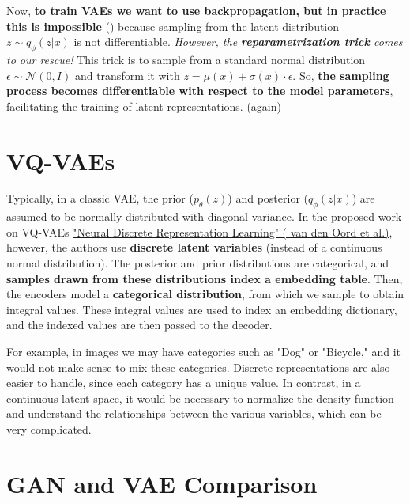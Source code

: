 Now, \textbf{to train VAEs we want to use backpropagation, but in practice this is impossible} () because sampling from the latent distribution $z \sim q_{\phi}(z|x)$ is not differentiable. \textit{However, the \textit{\textbf{reparametrization trick}} comes to our rescue!} This trick is to sample from a standard normal distribution $\epsilon \sim \mathcal{N}(0, I)$ and transform it with $z = \mu(x) + \sigma(x) \cdot \epsilon$. So, \textbf{the sampling process becomes differentiable with respect to the model parameters}, facilitating the training of latent representations.  (again)


\section{VQ-VAEs}

Typically, in a classic VAE, the prior ($p_{\theta}(z)$) and posterior ($q_{\phi}(z|x)$) are assumed to be normally distributed with diagonal variance. In the proposed work on VQ-VAEs \href{https://arxiv.org/pdf/1711.00937}{"Neural Discrete Representation Learning" ( van den Oord et al.)}, however, the authors use \textbf{discrete latent variables} (instead of a continuous normal distribution). The posterior and prior distributions are categorical, and \textbf{samples drawn from these distributions index a embedding table}. Then, the encoders model a \textbf{categorical distribution}, from which we sample to obtain integral values. These integral values are used to index an embedding dictionary, and the indexed values are then passed to the decoder.

For example, in images we may have categories such as "Dog" or "Bicycle," and it would not make sense to mix these categories. Discrete representations are also easier to handle, since each category has a unique value. In contrast, in a continuous latent space, it would be necessary to normalize the density function and understand the relationships between the various variables, which can be very complicated.
    

\section{GAN and VAE Comparison}

